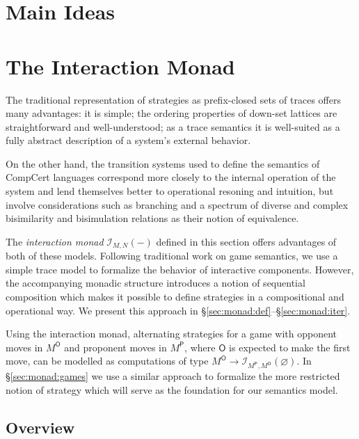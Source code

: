 \documentclass{article}
\newcommand{\kw}[1]{\ensuremath{ \mathsf{#1} }}
\begin{document}


\section{Main Ideas} %


\section{The Interaction Monad} \label{sec:monad} %


The traditional representation of strategies as
prefix-closed sets of traces
offers many advantages:
it is simple;
the ordering properties of down-set lattices
are straightforward and well-understood;
as a trace semantics
it is well-suited as a fully abstract description
of a system's external behavior.

On the other hand,
the transition systems
used to define the semantics of CompCert languages
correspond more closely to the internal operation of the system
and lend themselves better
to operational resoning and intuition,
but involve considerations such as branching
and a spectrum of diverse and complex bisimilarity
and bisimulation relations as their notion of equivalence.

The \emph{interaction monad} $\mathcal{I}_{M,N}(-)$
defined in this section offers advantages of both of these models.
Following traditional work on game semantics,
we use a simple trace model to formalize
the behavior of interactive components.
However,
the accompanying monadic structure
introduces a notion of sequential composition
which makes it possible to define strategies
in a compositional and operational way.
We present this approach in \S\ref{sec:monad:def}--\S\ref{sec:monad:iter}.

Using the interaction monad,
alternating strategies for a game with
opponent moves in $M^\kw{O}$ and
proponent moves in $M^\kw{P}$,
where $\kw{O}$ is expected to make the first move,
can be modelled as computations of type
$M^\kw{O} \rightarrow
      \mathcal{I}_{M^\kw{P}, M^\kw{O}}(\varnothing)$.
In \S\ref{sec:monad:games} we use a similar approach
to formalize the more restricted notion of strategy
which will serve as the foundation for our semantics model.


\subsection{Overview} \label{sec:monad:overview} %
\end{document}
